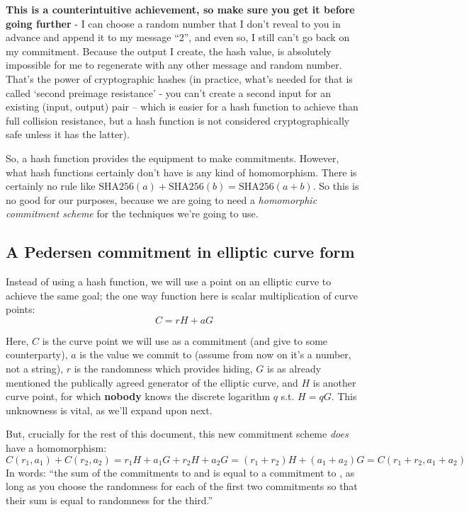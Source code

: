 \documentclass[10pt,a4paper]{article}
\begin{document}
\textbf{This is a counterintuitive achievement, so make sure you get it before going further }- I can choose a random number that I don't reveal to you in advance and append it to my message ``2'', and even so, I still can't go back on my commitment. Because the output I create, the
hash value, is absolutely impossible for me to regenerate with any other message and random
number. That's the power of cryptographic hashes (in practice, what's needed for that is called
`second preimage resistance' - you can't create a second input for an existing (input, output) pair -- which is easier for a hash function to achieve than full collision resistance, but a hash function is not considered cryptographically safe unless it has the latter).

So, a hash function provides the equipment to make commitments. However, what hash functions certainly don't have is any kind of homomorphism. There is certainly no rule like $\textrm{SHA256}(a) + \textrm{SHA256}(b) = \textrm{SHA256}(a+b)$. So this is no good for our purposes, because we are going to need a \emph{homomorphic commitment scheme} for the techniques we're going to use.

\hypertarget{a-pedersen-commitment-in-elliptic-curve-form}{%
\subsection[A Pedersen commitment in elliptic curve
form]{\texorpdfstring{\protect\hypertarget{anchor-15}{}{}A Pedersen
commitment in elliptic curve
form}{A Pedersen commitment in elliptic curve form}}\label{a-pedersen-commitment-in-elliptic-curve-form}}

Instead of using a hash function, we will use a point on an elliptic
curve to achieve the same goal; the one way function here is scalar
multiplication of curve points:
\[C = rH + aG \]

Here, $C$ is the curve point we will use as a commitment (and give to some
counterparty), $a$ is the value we commit to (assume from now on it's a
number, not a string), $r$ is the randomness which provides hiding, $G$ is as
already mentioned the publically agreed generator of the elliptic curve,
and $H$ is another curve point, for which \textbf{nobody} knows the discrete
logarithm $q$ s.t. $H=qG$. This unknowness is vital, as we'll expand upon next.

But, crucially for the rest of this document, this new commitment scheme
\emph{does} have a homomorphism:
\[C(r_1, a_1) + C(r_2, a_2) = r_1H + a_1G + r_2H + a_2G = (r_1 + r_2)H + (a_1 + a_2)G = C(r_1+r_2, a_1+a_2)\]
In words: ``the sum of the commitments to and is equal to a commitment
to , as long as you choose the randomness for each of the first two
commitments so that their sum is equal to randomness for the third.''
\end{document}
